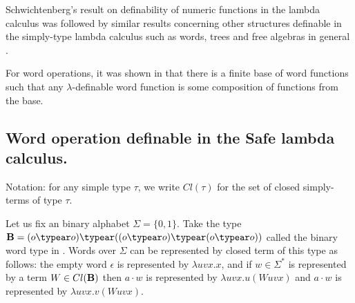 Schwichtenberg's result on definability of numeric functions in the
lambda calculus was followed by similar results concerning other
structures definable in the simply-type lambda calculus such as
words, trees and free algebras in general
\cite{DBLP:journals/tcs/Leivant93,DBLP:journals/apal/Zaionc91,702481,DBLP:journals/tcs/Zaionc87}.

For word operations, it was shown in
\cite{DBLP:journals/tcs/Zaionc87} that there is a finite base of
word functions such that any $\lambda$-definable word function is
some composition of functions from the base.


\subsection{Word operation definable in the Safe lambda calculus.}
Notation: for any simple type $\tau$, we write $Cl(\tau)$ for the set of closed simply-terms of type $\tau$.


Let us fix an binary alphabet $\Sigma = \{0,1\}$.
Take the type $\boldbool = (o\typear o)\typear ((o\typear o)\typear (o\typear o))$ called the binary word type in \cite{DBLP:journals/tcs/Zaionc87}. Words over $\Sigma$ can be represented by closed term of this type as follows: the empty word $\epsilon$ is represented by $\lambda u v x.x$, and if $w\in \Sigma^*$ is represented by a term $W \in Cl(\mathbf{B})$ then $a \cdot w$ is represented by $\lambda u v x. u(W uvx)$ and $a \cdot w$ is represented by $\lambda u v x. v(W uvx)$.
